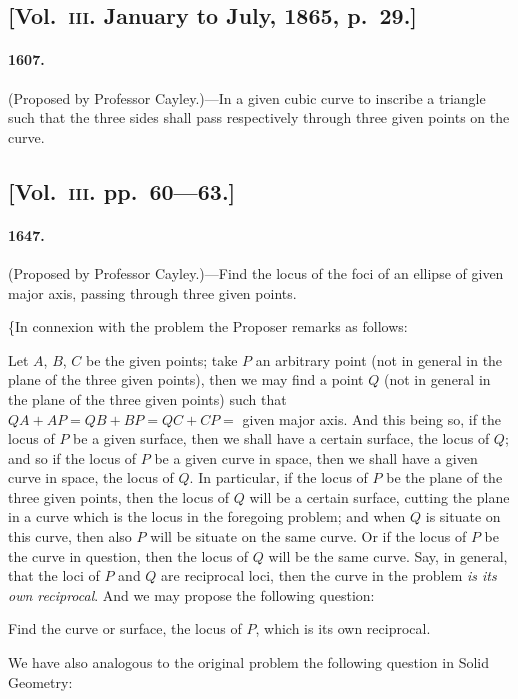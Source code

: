 \documentclass[11pt,a4paper]{article}
\begin{document}
\subsection*{[Vol.~\textsc{iii}. January to July, 1865, p.\ 29.]}

\paragraph*{1607.} (Proposed by Professor Cayley.)---In a given cubic curve to inscribe a
triangle such that the three sides shall pass respectively through three given points on
the curve.

\subsection*{[Vol.~\textsc{iii}. pp.\ 60---63.]}

\paragraph*{1647.} (Proposed by Professor Cayley.)---Find the locus of the foci of an ellipse
of given major axis, passing through three given points.

\{In connexion with the problem the Proposer remarks as follows:

Let $A$, $B$, $C$ be the given points; take $P$ an arbitrary point (not in general in
the plane of the three given points), then we may find a point $Q$ (not in general in
the plane of the three given points) such that $QA+AP = QB+BP = QC+CP =$
given major axis. And this being so, if the locus of $P$ be a given surface, then we
shall have a certain surface, the locus of $Q$; and so if the locus of $P$ be a given
curve in space, then we shall have a given curve in space, the locus of $Q$. In
particular, if the locus of $P$ be the plane of the three given points, then the locus
of $Q$ will be a certain surface, cutting the plane in a curve which is the locus in
the foregoing problem; and when $Q$ is situate on this curve, then also $P$ will be
situate on the same curve. Or if the locus of $P$ be the curve in question, then the
locus of $Q$ will be the same curve. Say, in general, that the loci of $P$ and $Q$ are
reciprocal loci, then the curve in the problem \textit{is its own reciprocal}. And we may
propose the following question:

Find the curve or surface, the locus of $P$, which is its own reciprocal.

We have also analogous to the original problem the following question in Solid
Geometry:
\end{document}
